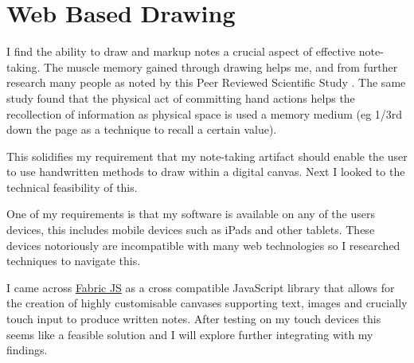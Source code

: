 \section{Web Based Drawing}
\label{research:WebBasedDrawing}
I find the ability to draw and markup notes a crucial aspect of effective note-taking. The muscle memory gained through drawing helps me, and from further research many people as noted by this Peer Reviewed Scientific Study \cite{umejimaPaperNotebooksVs2021}. The same study found that the physical act of committing hand actions helps the recollection of information as physical space is used a memory medium (eg 1/3rd down the page as a technique to recall a certain value).

This solidifies my requirement that my note-taking artifact should enable the user to use handwritten methods to draw within a digital canvas. Next I looked to the technical feasibility of this.

One of my requirements is that my software is available on any of the users devices, this includes mobile devices such as iPads and other tablets. These devices notoriously are incompatible with many web technologies so I researched techniques to navigate this.

I came across \href{https://fabricjs.com}{Fabric JS} as a cross compatible JavaScript library that allows for the creation of highly customisable canvases supporting text, images and crucially touch input to produce written notes. After testing on my touch devices this seems like a feasible solution and I will explore further integrating with my findings.
